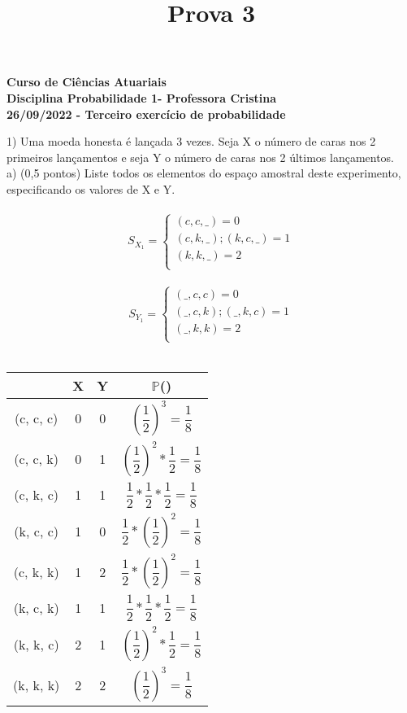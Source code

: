\documentclass[12pt,a4paper]{article}
\title{Prova 3}
\date{}
\begin{document}
	\maketitle
	\begin{center}
		\textbf{Curso de Ciências Atuariais}\\
		\textbf{Disciplina Probabilidade 1- Professora Cristina}\\
		\textbf{26/09/2022 - Terceiro exercício de probabilidade}
	\end{center}
	1) Uma moeda honesta é lançada 3 vezes. Seja X o número de caras nos 2 primeiros lançamentos e seja Y o número de caras nos 2 últimos lançamentos.\\
	a) (0,5 pontos) Liste todos os elementos do espaço amostral deste experimento, especificando os valores de X e Y.\\
	\vspace{0.5cm}\\
	\[
	S_{X_{1}} =
	\begin{cases}
	(c, c, \_) = 0\\
	(c, k, \_); (k, c, \_) = 1\\
	(k, k, \_) = 2\\
	\end{cases}
	\]
	\vspace{0.5cm}\\
	\[
	S_{Y_{1}} =
	\begin{cases}
	(\_, c, c) = 0\\
	(\_, c, k); (\_, k, c) = 1\\
	(\_, k, k) = 2\\
	\end{cases}
	\]
	\vspace{0.5cm}\\
	\begin{center}
		\begin{tabular}{cccc}\midrule
			& X & Y & $\mathbb{P}$()\\ \midrule
			(c, c, c) & 0 & 0 & $\left(\dfrac{1}{2}\right)^3 = \dfrac{1}{8}$\\ \midrule
			(c, c, k) & 0 & 1 & $\left(\dfrac{1}{2}\right)^2 * \dfrac{1}{2} = \dfrac{1}{8}$\\ \midrule
			(c, k, c) & 1 & 1 & $\dfrac{1}{2} * \dfrac{1}{2} * \dfrac{1}{2}= \dfrac{1}{8}$\\ \midrule
			(k, c, c) & 1 & 0 & $\dfrac{1}{2} * \left(\dfrac{1}{2}\right)^2 = \dfrac{1}{8}$\\ \midrule
			(c, k, k) & 1 & 2 & $\dfrac{1}{2} * \left(\dfrac{1}{2}\right)^2 = \dfrac{1}{8}$\\ \midrule
			(k, c, k) & 1 & 1 & $\dfrac{1}{2} * \dfrac{1}{2} * \dfrac{1}{2}= \dfrac{1}{8}$\\ \midrule
			(k, k, c) & 2 & 1 & $\left(\dfrac{1}{2}\right)^2 * \dfrac{1}{2} = \dfrac{1}{8}$\\ \midrule
			(k, k, k) & 2 & 2 & $\left(\dfrac{1}{2}\right)^3 = \dfrac{1}{8}$\\ \midrule
		\end{tabular}
	\end{center}
\end{document}
